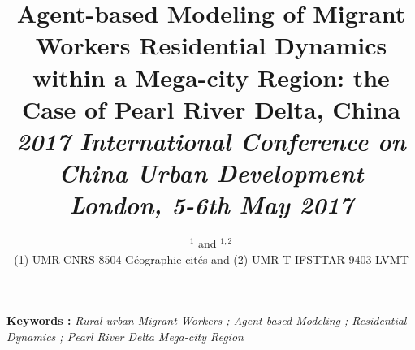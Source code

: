 


\title{Agent-based Modeling of Migrant Workers Residential Dynamics within a Mega-city Region: the Case of Pearl River Delta, China\\
\bigskip\bigskip
\textit{2017 International Conference on China Urban Development}\\
\textit{London, 5-6th May 2017}
}

\bigskip
\bigskip
\bigskip
\author{$^{1}$ and $^{1,2}$\\
\small(1) UMR CNRS 8504 Géographie-cités and (2) UMR-T IFSTTAR 9403 LVMT
}
\date{}

\maketitle

\justify




\vspace{1cm}

\textbf{Keywords : }\textit{Rural-urban Migrant Workers ; Agent-based Modeling ; Residential Dynamics ; Pearl River Delta Mega-city Region}

\vspace{1.5cm}


